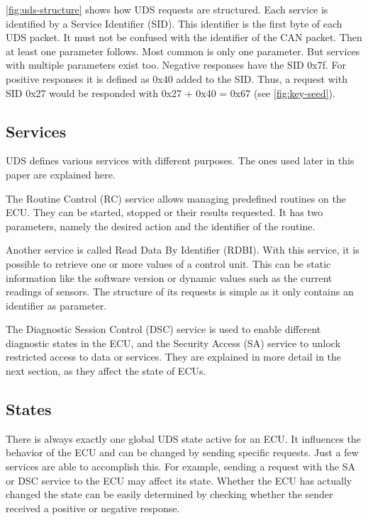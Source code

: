 \autoref{fig:uds-structure} shows how UDS requests are structured. Each service is identified by a Service Identifier (SID). This identifier is the first byte of each UDS packet. It must not be confused with the identifier of the CAN packet. Then at least one parameter follows. Most common is only one parameter. But services with multiple parameters exist too.
Negative responses have the SID 0x7f.
For positive responses it is defined as 0x40 added to the SID. Thus, a request with SID 0x27 would be responded with 0x27 + 0x40 = 0x67 (see \autoref{fig:key-seed}).

\subsection{Services}
\label{subsubsec:uds-services}

UDS defines various services with different purposes. The ones used later in this paper are explained here.

The Routine Control (RC) service allows managing predefined routines on the ECU. They can be started, stopped or their results requested. It has two parameters, namely the desired action and the identifier of the routine.

Another service is called Read Data By Identifier (RDBI). With this service, it is possible to retrieve one or more values of a control unit. This can be static information like the software version or dynamic values such as the current readings of sensors. The structure of its requests is simple as it only contains an identifier as parameter.

The Diagnostic Session Control (DSC) service is used to enable different diagnostic states in the ECU, and the Security Access (SA) service to unlock restricted access to data or services. They are explained in more detail in the next section, as they affect the state of ECUs.

\subsection{States}
\label{subsec:states}

There is always exactly one global UDS state active for an ECU. It influences the behavior of the ECU and can be changed by sending specific requests. Just a few services are able to accomplish this. For example, sending a request with the SA or DSC service to the ECU may affect its state. Whether the ECU has actually changed the state can be easily determined by checking whether the sender received a positive or negative response.

